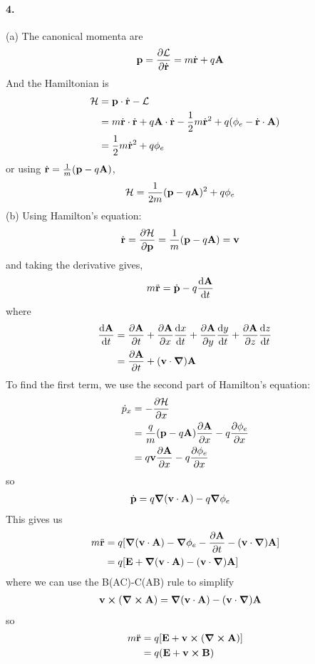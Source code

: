 \documentclass[../hw.tex]{subfiles}
\begin{document}
\paragraph*{4.} (a) The canonical momenta are
\begin{align*}
    \vb p &= \pdv{\mathcal{L}}{\dot{\vb r}} = m \dot{\vb r} 
        + q \vb A
\end{align*}
And the Hamiltonian is
\begin{align*}
    \mathcal{H} &= \vb p \cdot \dot{\vb r} - \mathcal{L} \\
    &= m \dot{\vb r} \cdot \dot{\vb r} + q \vb A \cdot \dot{\vb r} 
        - \frac{1}{2} m \dot{\vb r}^2 + q (\phi_e - \dot{\vb r} \cdot \vb A) \\
    &= \frac{1}{2} m \dot{\vb r}^2 + q \phi_e
\end{align*}
or using $\dot{\vb r} = \frac{1}{m} (\vb p - q \vb A)$,
\begin{align*}
    \mathcal{H} &= \frac{1}{2m}(\vb p - q \vb A)^2 + q \phi_e
\end{align*}
(b) Using Hamilton's equation:
\begin{align*}
    \dot{\vb r} &= \pdv{\mathcal{H}}{\vb p} = \frac{1}{m} (\vb p - q \vb A) = \vb v
\end{align*}
and taking the derivative gives,
\begin{align*}
    m \ddot{\vb r} &= \dot{\vb p} - q \dv{\vb A}{t}
\end{align*}
where
\begin{align*}
    \dv{\vb A}{t} &= \pdv{\vb A}{t} + \pdv{\vb A}{x}\dv{x}{t} + \pdv{\vb A}{y}\dv{y}{t} + \pdv{\vb A}{z}\dv{z}{t} \\
    &= \pdv{\vb A}{t} + (\vb v \cdot \grad) \vb A
\end{align*}
To find the first term, we use the second part of Hamilton's equation:
\begin{align*}
    \dot{p}_x &= - \pdv{\mathcal{H}}{x} \\
    &= \frac{q}{m} (\vb p - q \vb A) \pdv{\vb A}{x} - q \pdv{\phi_e}{x}\\
    &= q \vb v \pdv{\vb A}{x} - q \pdv{\phi_e}{x}
\end{align*}
so 
\begin{align*}
    \dot{\vb p} &= q \grad(\vb v \cdot \vb A) - q \grad \phi_e
\end{align*}
This gives us
\begin{align*}
    m \ddot{\vb r} &= q[\grad(\vb v \cdot \vb A) - \grad \phi_e - \pdv{\vb A}{t} - (\vb v \cdot \grad) \vb A] \\
    &= q[\vb E + \grad(\vb v \cdot \vb A) - (\vb v \cdot \grad) \vb A]
\end{align*}
where we can use the B(AC)-C(AB) rule to simplify
\begin{align*}
    \vb v \cross (\curl \vb A) &= \grad(\vb v \cdot \vb A) - (\vb v \cdot \grad) \vb A
\end{align*}
so
\begin{align*}
    m \ddot{\vb r} &= q[\vb E + \vb v \cross (\curl \vb A)] \\
    &= q(\vb E + \vb v \cross \vb B)
\end{align*}
\end{document}
